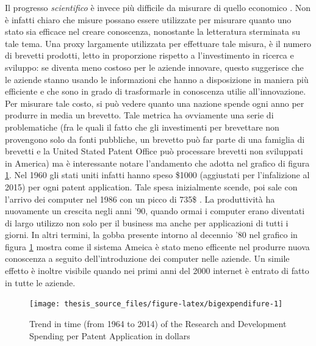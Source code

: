 \documentclass[]{book}
\begin{document}
Il progresso \emph{scientifico} è invece più difficile da misurare di
quello economico
\citep{hirsch2005index, hauschildt1991towards, van2000evaluation, erno2011measuring, bornmann2013societal, bornmann2014evaluate, bornmann2017does}.
Non è infatti chiaro che misure possano essere utilizzate per misurare
quanto uno stato sia efficace nel creare conoscenza, nonostante la
letteratura sterminata su tale tema. Una proxy largamente utilizzata per
effettuare tale misura, è il numero di brevetti prodotti, letto in
proporzione rispetto a l'investimento in ricerca e sviluppo: se diventa
meno costoso per le aziende innovare, questo suggerisce che le aziende
stanno usando le informazioni che hanno a disposizione in maniera più
efficiente e che sono in grado di trasformarle in conoscenza utilie
all'innovazione. Per misurare tale costo, si può vedere quanto una
nazione spende ogni anno per produrre in media un brevetto. Tale metrica
ha ovviamente una serie di problematiche (fra le quali il fatto che gli
investimenti per brevettare non provengono solo da fonti pubbliche, un
brevetto può far parte di una famiglia di brevetti e la United Stated
Patent Office può processare brevetti non sviluppati in America) ma è
interessante notare l'andamento che adotta nel grafico di figura
\ref{fig:bigexpendifure}. Nel 1960 gli stati uniti infatti hanno speso
\$1000 (aggiustati per l'infalizione al 2015) per ogni patent
application. Tale spesa inizialmente scende, poi sale con l'arrivo dei
computer nel 1986 con un picco di 735\$ \citep{silver2012signal}. La
produttività ha nuovamente un crescita negli anni '90, quando ormai i
computer erano diventati di largo utilizzo non solo per il business ma
anche per applicazioni di tutti i giorni. In altri termini, la gobba
presente intorno al decennio '80 nel grafico in figura
\ref{fig:bigexpendifure} mostra come il sistema Ameica è stato meno
efficente nel produrre nuova conoscenza a seguito dell'introduzione dei
computer nelle aziende. Un simile effetto è inoltre visibile quando nei
primi anni del 2000 internet è entrato di fatto in tutte le aziende.

\begin{figure}

{\centering \texttt{[image: thesis\_source\_files/figure-latex/bigexpendifure-1]} 

}

\caption{Trend in time (from 1964 to 2014) of the Research and Development Spending per Patent Application in dollars}\label{fig:bigexpendifure}
\end{figure}
\end{document}
